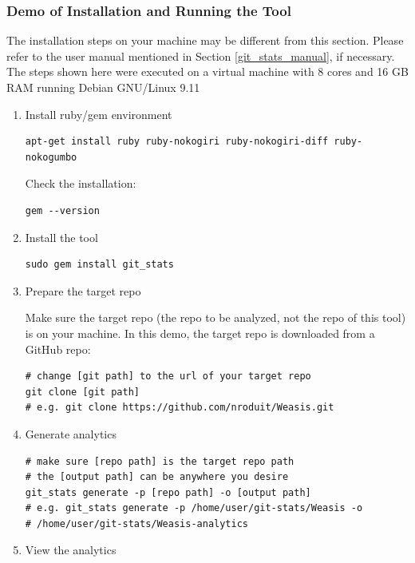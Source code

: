 \documentclass[letterpaper,cleveref]{lipics-v2019}
\begin{document}
\subsubsection{Demo of Installation and Running the Tool}

The installation steps on your machine may be different from this section.
Please refer to the user manual mentioned in Section \ref{git_stats_manual}, if
necessary.  The steps shown here were executed on a virtual machine with 8 cores
and 16 GB RAM running Debian GNU/Linux 9.11

\begin{enumerate}
\item Install ruby/gem environment
\begin{lstlisting}
apt-get install ruby ruby-nokogiri ruby-nokogiri-diff ruby-nokogumbo
\end{lstlisting}

Check the installation:
\begin{lstlisting}
gem --version
\end{lstlisting}
    
\item Install the tool
\begin{lstlisting}
sudo gem install git_stats
\end{lstlisting}
    
\item Prepare the target repo

Make sure the target repo (the repo to be analyzed, not the repo of this tool)
is on your machine.
In this demo, the target repo is downloaded from a GitHub repo:
\begin{lstlisting}
# change [git path] to the url of your target repo
git clone [git path]
# e.g. git clone https://github.com/nroduit/Weasis.git
\end{lstlisting}
    
\item Generate analytics
\begin{lstlisting}
# make sure [repo path] is the target repo path
# the [output path] can be anywhere you desire
git_stats generate -p [repo path] -o [output path]
# e.g. git_stats generate -p /home/user/git-stats/Weasis -o 
# /home/user/git-stats/Weasis-analytics
\end{lstlisting}
    
\item View the analytics


\end{enumerate}
\end{document}
